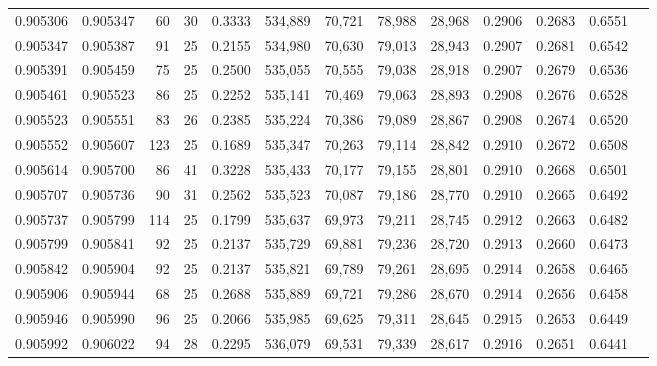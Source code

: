 \begin{tabular}{rrrrrrrrrrrrr}
0.905306 & 0.905347 &    60 &  30 &                                     0.3333 & 534,889 &  70,721 &  78,988 &  28,968 & 0.2906 & 0.2683 & 0.6551 \\
0.905347 & 0.905387 &    91 &  25 &                                     0.2155 & 534,980 &  70,630 &  79,013 &  28,943 & 0.2907 & 0.2681 & 0.6542 \\
0.905391 & 0.905459 &    75 &  25 &                                     0.2500 & 535,055 &  70,555 &  79,038 &  28,918 & 0.2907 & 0.2679 & 0.6536 \\
0.905461 & 0.905523 &    86 &  25 &                                     0.2252 & 535,141 &  70,469 &  79,063 &  28,893 & 0.2908 & 0.2676 & 0.6528 \\
0.905523 & 0.905551 &    83 &  26 &                                     0.2385 & 535,224 &  70,386 &  79,089 &  28,867 & 0.2908 & 0.2674 & 0.6520 \\
0.905552 & 0.905607 &   123 &  25 &                                     0.1689 & 535,347 &  70,263 &  79,114 &  28,842 & 0.2910 & 0.2672 & 0.6508 \\
0.905614 & 0.905700 &    86 &  41 &                                     0.3228 & 535,433 &  70,177 &  79,155 &  28,801 & 0.2910 & 0.2668 & 0.6501 \\
0.905707 & 0.905736 &    90 &  31 &                                     0.2562 & 535,523 &  70,087 &  79,186 &  28,770 & 0.2910 & 0.2665 & 0.6492 \\
0.905737 & 0.905799 &   114 &  25 &                                     0.1799 & 535,637 &  69,973 &  79,211 &  28,745 & 0.2912 & 0.2663 & 0.6482 \\
0.905799 & 0.905841 &    92 &  25 &                                     0.2137 & 535,729 &  69,881 &  79,236 &  28,720 & 0.2913 & 0.2660 & 0.6473 \\
0.905842 & 0.905904 &    92 &  25 &                                     0.2137 & 535,821 &  69,789 &  79,261 &  28,695 & 0.2914 & 0.2658 & 0.6465 \\
0.905906 & 0.905944 &    68 &  25 &                                     0.2688 & 535,889 &  69,721 &  79,286 &  28,670 & 0.2914 & 0.2656 & 0.6458 \\
0.905946 & 0.905990 &    96 &  25 &                                     0.2066 & 535,985 &  69,625 &  79,311 &  28,645 & 0.2915 & 0.2653 & 0.6449 \\
0.905992 & 0.906022 &    94 &  28 &                                     0.2295 & 536,079 &  69,531 &  79,339 &  28,617 & 0.2916 & 0.2651 & 0.6441 \\

\end{tabular}
